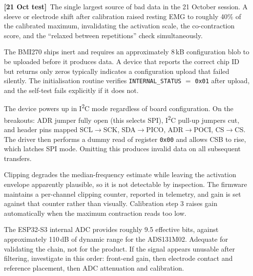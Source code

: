 \documentclass[11pt]{article}
\newcommand{\tested}{{\sffamily\scriptsize\color{good}\textbf{[21 Oct test]}}\ }
\begin{document}
\begin{description}[leftmargin=0pt,style=unboxed,itemsep=5pt]

\item[\textcolor{marker}{Electrode contact drift during a session.}] \tested The
single largest source of bad data in the 21 October session. A sleeve or
electrode shift after calibration raised resting EMG to roughly 40\% of the
calibrated maximum, invalidating the activation scale, the co-contraction score,
and the ``relaxed between repetitions'' check simultaneously.

\item[\textcolor{marker}{BMI270 configuration upload.}] The BMI270 ships inert
and requires an approximately 8\,kB configuration blob to be uploaded before it
produces data. A device that reports the correct chip ID but returns only zeros
typically indicates a configuration upload that failed silently. The
initialisation routine verifies \texttt{INTERNAL\_STATUS} $=$ \texttt{0x01} after
upload, and the self-test fails explicitly if it does not.

\item[\textcolor{marker}{BMI270 SPI mode entry.}] The device powers up in
I\textsuperscript{2}C mode regardless of board configuration. On the breakouts:
ADR jumper fully open (this selects SPI), I\textsuperscript{2}C pull-up jumpers
cut, and header pins mapped SCL$\rightarrow$SCK, SDA$\rightarrow$PICO,
ADR$\rightarrow$POCI, CS$\rightarrow$CS. The driver then performs a dummy read of
register \texttt{0x00} and allows CSB to rise, which latches SPI mode. Omitting
this produces invalid data on all subsequent transfers.

\item[\textcolor{marker}{Front-end gain and clipping.}] Clipping degrades the
median-frequency estimate while leaving the activation envelope apparently
plausible, so it is not detectable by inspection. The firmware maintains a
per-channel clipping counter, reported in telemetry, and gain is set against that
counter rather than visually. Calibration step 3 raises gain automatically when
the maximum contraction reads too low.

\item[\textcolor{marker}{Internal ADC noise in Phase 1.}] The ESP32-S3 internal
ADC provides roughly 9.5 effective bits, against approximately 110\,dB of dynamic
range for the ADS131M02. Adequate for validating the chain, not for the product.
If the signal appears unusable after filtering, investigate in this order:
front-end gain, then electrode contact and reference placement, then ADC
attenuation and calibration.


\end{description}
\end{document}
